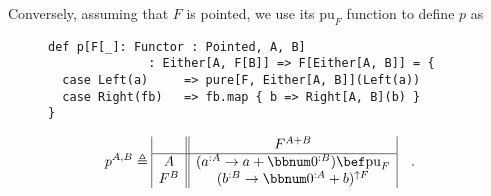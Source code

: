 Conversely, assuming that $F$ is pointed, we use its $\text{pu}_{F}$
function to define $p$ as

\begin{wrapfigure}{l}{0.58\columnwidth}%
\vspace{-0.2\baselineskip}
\begin{lstlisting}
def p[F[_]: Functor : Pointed, A, B]
              : Either[A, F[B]] => F[Either[A, B]] = {
  case Left(a)     => pure[F, Either[A, B]](Left(a))
  case Right(fb)   => fb.map { b => Right[A, B](b) }
}
\end{lstlisting}

\vspace{-4\baselineskip}
\end{wrapfigure}%

\noindent \vspace{-0.75\baselineskip}
\[
p^{A,B}\triangleq\begin{array}{|c||c|}
 & F^{A+B}\\
\hline A & (a^{:A}\rightarrow a+\bbnum 0^{:B})\bef\text{pu}_{F}\\
F^{B} & (b^{:B}\rightarrow\bbnum 0^{:A}+b)^{\uparrow F}
\end{array}\quad.
\]

